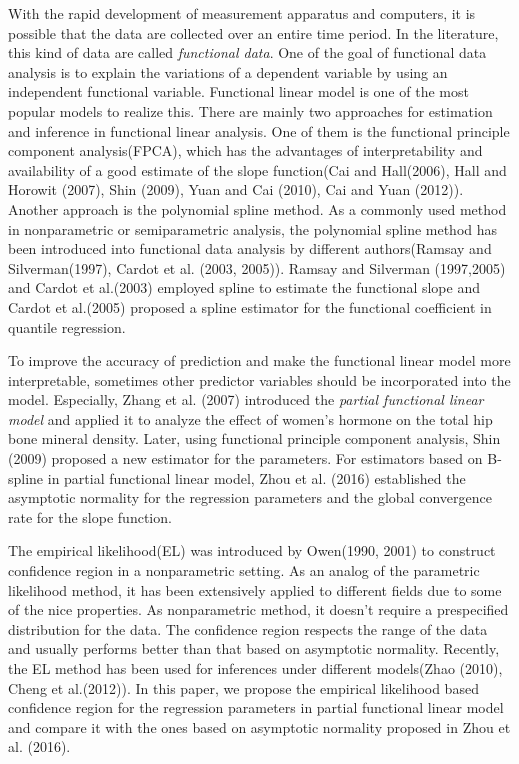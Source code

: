 \documentclass[preprint,12pt]{elsarticle}
\begin{document}
	With the rapid development of measurement apparatus and computers, it is possible that the data are collected over an entire time period. In the literature, this kind of data are called \textit{functional data}. One of the goal of functional data analysis is to explain the variations of a dependent variable by using an independent functional variable. Functional linear model is one of the most popular models to realize this. There are mainly two approaches for estimation and inference in functional linear analysis. One of them is the functional principle component analysis(FPCA), which has the advantages of interpretability and availability of a good estimate of the slope function(Cai and Hall(2006), Hall and Horowit (2007), Shin (2009), Yuan and Cai (2010), Cai and Yuan (2012)). Another approach is the polynomial spline method. As a commonly used method in nonparametric or semiparametric analysis, the polynomial spline method has been introduced into functional data analysis by different authors(Ramsay and Silverman(1997), Cardot et al. (2003, 2005)). Ramsay and Silverman (1997,2005) and Cardot et al.(2003) employed spline to estimate the functional slope and Cardot et al.(2005) proposed a spline estimator for the functional coefficient in quantile regression.
	
	
	 To improve the accuracy of prediction and make the functional linear model more interpretable, sometimes other predictor variables should be incorporated into the model. Especially, Zhang et al. (2007) introduced the \textit{partial functional linear model} and applied it to analyze the effect of women's hormone on the total hip bone mineral density. Later, using functional principle component analysis, Shin (2009) proposed a new estimator for the parameters. For estimators based on B-spline in partial functional linear model, Zhou et al. (2016) established the asymptotic normality for the regression parameters and the global convergence rate for the slope function.
	
	
	

	
	 The empirical likelihood(EL) was introduced by Owen(1990, 2001) to construct confidence region in a nonparametric setting. As an analog of the parametric likelihood method, it has been extensively applied to different fields due to some of the nice properties. As nonparametric method, it doesn't require a prespecified distribution for the data. The confidence region respects the range of the data and usually performs better than that based on asymptotic normality. Recently, the EL method has been used for inferences under different models(Zhao (2010), Cheng et al.(2012)). 
	 In this paper, we propose the empirical likelihood based confidence region for the regression parameters in partial functional linear model and compare it with the ones based on asymptotic normality proposed in Zhou et al. (2016).
\end{document}
